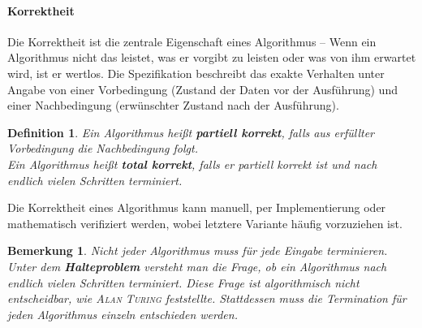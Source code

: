 \documentclass[11pt,a4paper]{scrartcl}
\newtheorem{note}{Bemerkung}
\newtheorem{definition}{Definition}
\begin{document}
\paragraph{Korrektheit}
Die Korrektheit ist die zentrale Eigenschaft eines Algorithmus -- Wenn ein Algorithmus nicht das leistet, was er vorgibt zu leisten oder was von ihm erwartet wird, ist er wertlos. Die Spezifikation beschreibt das exakte Verhalten unter Angabe von einer Vorbedingung (Zustand der Daten vor der Ausführung) und einer Nachbedingung (erwünschter Zustand nach der Ausführung).
\begin{definition}
Ein Algorithmus heißt \textbf{partiell korrekt}, falls aus erfüllter Vorbedingung die Nachbedingung folgt. \\
Ein Algorithmus heißt \textbf{total korrekt}, falls er partiell korrekt ist und nach endlich vielen Schritten terminiert.
\end{definition}
Die Korrektheit eines Algorithmus kann manuell, per Implementierung oder mathematisch verifiziert werden, wobei letztere Variante häufig vorzuziehen ist.
\begin{note}
Nicht jeder Algorithmus muss für jede Eingabe terminieren. Unter dem \textbf{Halteproblem} versteht man die Frage, ob ein Algorithmus nach endlich vielen Schritten terminiert. Diese Frage ist algorithmisch nicht entscheidbar, wie \textsc{Alan Turing} feststellte. Stattdessen muss die Termination für jeden Algorithmus einzeln entschieden werden.
\end{note}
\end{document}
